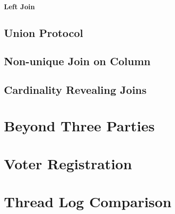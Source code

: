 \paragraph{Left Join}


\subsection{Union Protocol}


\subsection{Non-unique Join on Column}

\subsection{Cardinality Revealing Joins}

\section{Beyond Three Parties}

\section{Voter Registration}

\section{Thread Log Comparison}



